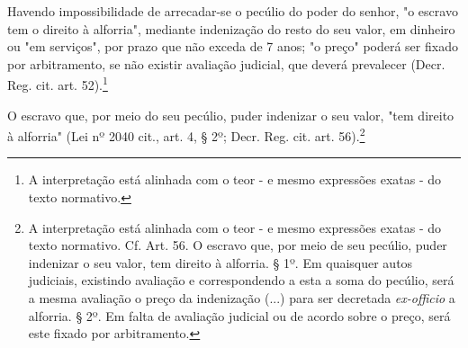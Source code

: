 Havendo impossibilidade de arrecadar-se o pecúlio do poder do senhor, "o
escravo tem o direito à alforria", mediante indenização do resto do seu
valor, em dinheiro ou "em serviços", por prazo que não exceda de 7 anos;
"o preço" poderá ser fixado por arbitramento, se não existir avaliação
judicial, que deverá prevalecer (Decr. Reg. cit. art. 52).\footnote{A
  interpretação está alinhada com o teor - e mesmo expressões exatas -
  do texto normativo.}

O escravo que, por meio do seu pecúlio, puder indenizar o seu valor,
"tem direito à alforria" (Lei nº 2040 cit., art. 4, § 2º; Decr. Reg.
cit. art. 56).\footnote{A interpretação está alinhada com o teor - e
  mesmo expressões exatas - do texto normativo. Cf. Art. 56. O escravo
  que, por meio de seu pecúlio, puder indenizar o seu valor, tem direito
  à alforria. § 1º. Em quaisquer autos judiciais, existindo avaliação e
  correspondendo a esta a soma do pecúlio, será a mesma avaliação o
  preço da indenização (...) para ser decretada \emph{ex-officio} a
  alforria. § 2º. Em falta de avaliação judicial ou de acordo sobre o
  preço, será este fixado por arbitramento.}

